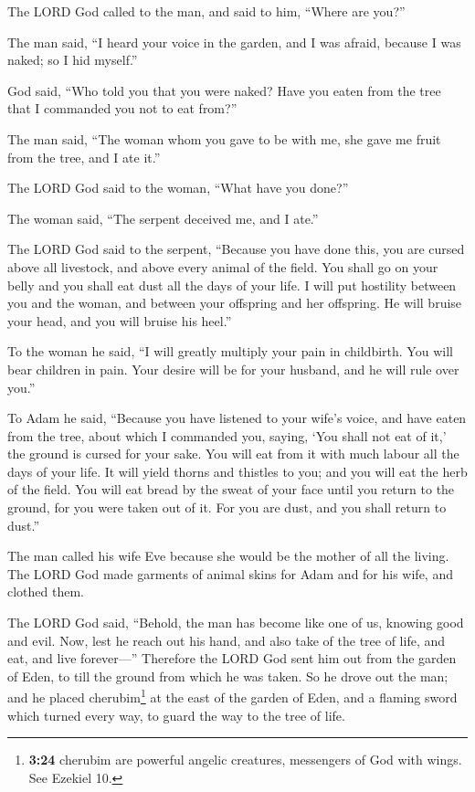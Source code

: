  The LORD God called to the man, and said to him, ``Where
are you?''

 The man said, ``I heard your voice in the garden, and I
was afraid, because I was naked; so I hid myself.''

 God said, ``Who told you that you were naked? Have you
eaten from the tree that I commanded you not to eat from?''

 The man said, ``The woman whom you gave to be with me,
she gave me fruit from the tree, and I ate it.''

 The LORD God said to the woman, ``What have you done?''

The woman said, ``The serpent deceived me, and I ate.''

 The LORD God said to the serpent, ``Because you have
done this, you are cursed above all livestock, and above every animal of
the field. You shall go on your belly and you shall eat dust all the
days of your life.  I will put hostility between you and
the woman, and between your offspring and her offspring. He will bruise
your head, and you will bruise his heel.''

 To the woman he said, ``I will greatly multiply your
pain in childbirth. You will bear children in pain. Your desire will be
for your husband, and he will rule over you.''

 To Adam he said, ``Because you have listened to your
wife's voice, and have eaten from the tree, about which I commanded you,
saying, `You shall not eat of it,' the ground is cursed for your sake.
You will eat from it with much labour all the days of your life.
 It will yield thorns and thistles to you; and you will
eat the herb of the field.  You will eat bread by the
sweat of your face until you return to the ground, for you were taken
out of it. For you are dust, and you shall return to dust.''

 The man called his wife Eve because she would be the
mother of all the living.  The LORD God made garments of
animal skins for Adam and for his wife, and clothed them.

 The LORD God said, ``Behold, the man has become like one
of us, knowing good and evil. Now, lest he reach out his hand, and also
take of the tree of life, and eat, and live forever---'' 
Therefore the LORD God sent him out from the garden of Eden, to till the
ground from which he was taken.  So he drove out the man;
and he placed cherubim\footnote{\textbf{3:24} cherubim are powerful
  angelic creatures, messengers of God with wings. See Ezekiel 10.} at
the east of the garden of Eden, and a flaming sword which turned every
way, to guard the way to the tree of life.

